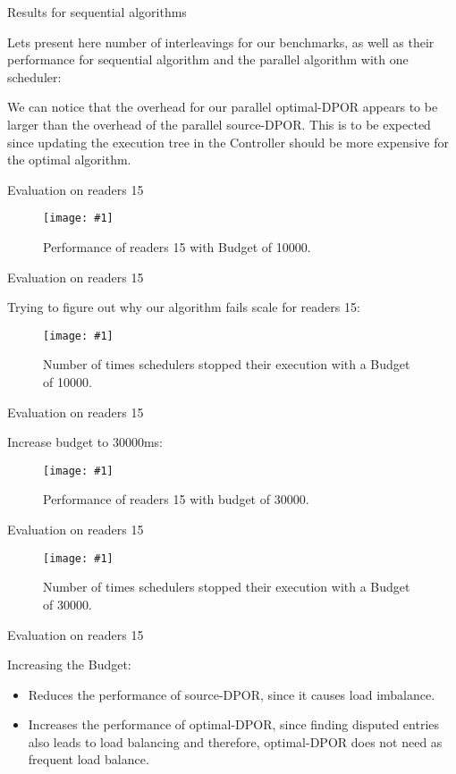 \documentclass[9pt]{beamer}
\newcommand{\customGraph}[2]{
\begin{figure}[H]
\centering
\texttt{[image: \#1]}
\caption{#2}
\label{#2}
\end{figure}
}
\newcommand{\bigtabular}[2]{
 \begin{table} 
   \resizebox{\linewidth}{!}{
      
    }
    \caption{#2}
    \label{#2}
 \end{table}
}
\begin{document}
\begin{frame}{Results for sequential algorithms}

Lets present here number of interleavings for our benchmarks, as well as their performance for sequential algorithm and the parallel algorithm with one scheduler:

\bigtabular{"../tables/synthetic_unbounded.tex"}{Sequential performance of source-DPOR and optimal-DPOR on four benchmarks.}

We can notice that the overhead for our parallel optimal-DPOR appears to be larger than the overhead of the parallel source-DPOR.
This is to be expected since updating the execution tree in the Controller should be more expensive for the optimal algorithm.


\end{frame}

\begin{frame}{Evaluation on readers 15}

\customGraph{../scripts/readers_15_10000_combo_time.png}{Performance of readers 15 with Budget of 10000.}

\end{frame}


\begin{frame}{Evaluation on readers 15}

Trying to figure out why our algorithm fails scale for readers 15:

\customGraph{../scripts/readers1510000_combined_stack.png}{Number of times schedulers stopped their execution with a Budget of 10000.}

\end{frame}


\begin{frame}{Evaluation on readers 15}

Increase budget to 30000ms:

\customGraph{../scripts/readers_15_30000_combo_time.png}{Performance of readers 15 with budget of 30000.}

\end{frame}

\begin{frame}{Evaluation on readers 15}


\customGraph{../scripts/readers1530000_combined_stack.png}{Number of times schedulers stopped their execution with a Budget of 30000.}

\end{frame}


\begin{frame}{Evaluation on readers 15}

Increasing the Budget:

\begin{itemize}[<+->]
\item Reduces the performance of source-DPOR, since it causes load imbalance.
\item Increases the performance of optimal-DPOR, since finding disputed entries also leads to load balancing and therefore,
optimal-DPOR does not need as frequent load balance.
\end{itemize}

\end{frame}
\end{document}
